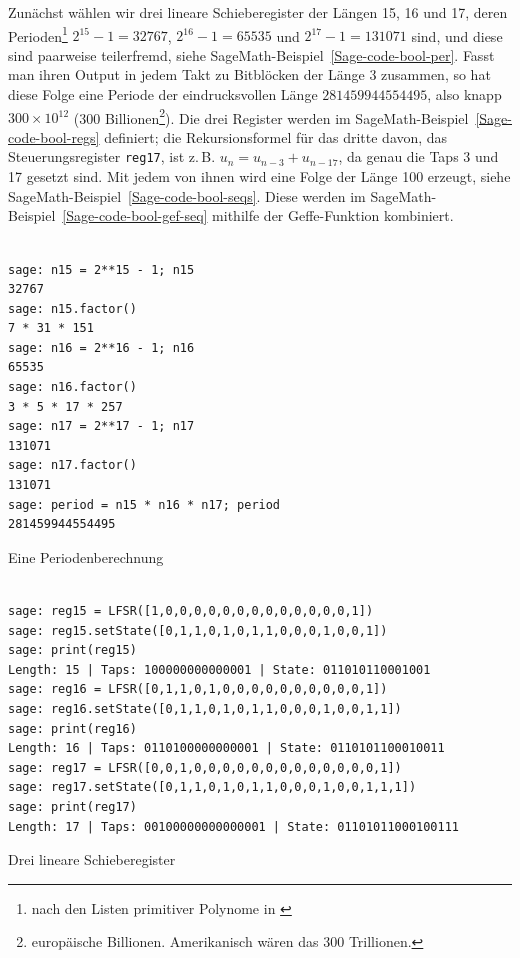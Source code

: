 \begin{refsegment}
Zunächst wählen wir drei lineare Schieberegister der Längen 15, 16 und 17,
deren Perioden\footnote{%
  nach den Listen primitiver Polynome in \cite{Menezes2001}
} $2^{15} - 1 = 32767$, $2^{16} - 1 = 65535$ und
$2^{17} - 1 = 131071$ sind, und diese sind paarweise teilerfremd, siehe
SageMath-Beispiel~\ref{Sage-code-bool-per}.
Fasst man ihren Output in jedem Takt zu Bitblöcken der Länge $3$
zusammen, so hat diese Folge eine Periode der eindrucksvollen Länge
$281459944554495$, also knapp $300 \times 10^{12}$ (300 Billionen\footnote{%
  europäische Billionen. Amerikanisch wären das 300 Trillionen.
}).
Die drei Register werden im SageMath-Beispiel~\ref{Sage-code-bool-regs}
definiert; die Rekursionsformel für das dritte davon, das
Steuerungsregister {\tt reg17}, ist z.\,B. $u_n = u_{n-3} + u_{n-17}$,
da genau die Taps 3 und 17 gesetzt sind.
Mit jedem von ihnen wird eine Folge der Länge 100 erzeugt,
siehe SageMath-Beispiel~\ref{Sage-code-bool-seqs}. Diese werden im
SageMath-Beispiel~\ref{Sage-code-bool-gef-seq} mithilfe der
Geffe-Funktion kombiniert.

\begin{sagecode}
\begin{verbatim}

sage: n15 = 2**15 - 1; n15
32767
sage: n15.factor()
7 * 31 * 151
sage: n16 = 2**16 - 1; n16
65535
sage: n16.factor()
3 * 5 * 17 * 257
sage: n17 = 2**17 - 1; n17
131071
sage: n17.factor()
131071
sage: period = n15 * n16 * n17; period
281459944554495
\end{verbatim}
\caption{Eine Periodenberechnung}\label{Sage-code-bool-per}
\end{sagecode}

\begin{sagecode}
\begin{verbatim}

sage: reg15 = LFSR([1,0,0,0,0,0,0,0,0,0,0,0,0,0,1])
sage: reg15.setState([0,1,1,0,1,0,1,1,0,0,0,1,0,0,1])
sage: print(reg15)
Length: 15 | Taps: 100000000000001 | State: 011010110001001
sage: reg16 = LFSR([0,1,1,0,1,0,0,0,0,0,0,0,0,0,0,1])
sage: reg16.setState([0,1,1,0,1,0,1,1,0,0,0,1,0,0,1,1])
sage: print(reg16)
Length: 16 | Taps: 0110100000000001 | State: 0110101100010011
sage: reg17 = LFSR([0,0,1,0,0,0,0,0,0,0,0,0,0,0,0,0,1])
sage: reg17.setState([0,1,1,0,1,0,1,1,0,0,0,1,0,0,1,1,1])
sage: print(reg17)
Length: 17 | Taps: 00100000000000001 | State: 01101011000100111
\end{verbatim}
\caption{Drei lineare Schieberegister}\label{Sage-code-bool-regs}
\end{sagecode}


\end{refsegment}
